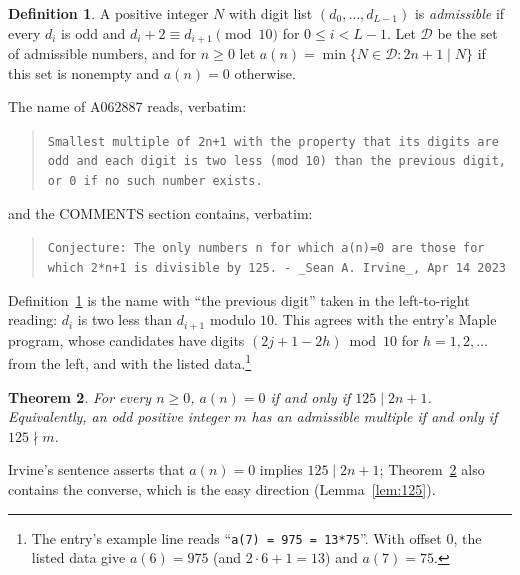 \documentclass[11pt]{amsart}
\theoremstyle{plain}
\newtheorem{theorem}{Theorem}
\theoremstyle{definition}
\newtheorem{definition}[theorem]{Definition}
\newcommand{\cD}{\mathcal{D}}
\begin{document}
\begin{definition}\label{def:adm}
A positive integer $N$ with digit list $(d_0,\dots,d_{L-1})$ is \emph{admissible} if every $d_i$ is odd and $d_i+2\equiv d_{i+1}\pmod{10}$ for $0\le i<L-1$. Let $\cD$ be the set of admissible numbers, and for $n\ge0$ let $a(n)=\min\{N\in\cD: 2n+1\mid N\}$ if this set is nonempty and $a(n)=0$ otherwise.
\end{definition}

The name of A062887 \cite{A062887} reads, verbatim:
\begin{quote}
{\small\texttt{Smallest multiple of 2n+1 with the property that its digits are odd and each digit is two less (mod 10) than the previous digit, or 0 if no such number exists.}}
\end{quote}
and the COMMENTS section contains, verbatim:
\begin{quote}
{\small\texttt{Conjecture: The only numbers n for which a(n)=0 are those for which 2*n+1 is divisible by 125. - \_Sean A. Irvine\_, Apr 14 2023}}
\end{quote}
Definition~\ref{def:adm} is the name with ``the previous digit'' taken in the left-to-right reading: $d_i$ is two less than $d_{i+1}$ modulo $10$. This agrees with the entry's Maple program, whose candidates have digits $(2j+1-2h)\bmod 10$ for $h=1,2,\dots$ from the left, and with the listed data.\footnote{The entry's example line reads ``\texttt{a(7) = 975 = 13*75}''. With offset $0$, the listed data give $a(6)=975$ (and $2\cdot6+1=13$) and $a(7)=75$.}

\begin{theorem}\label{thm:main}
For every $n\ge0$, $a(n)=0$ if and only if $125\mid 2n+1$. Equivalently, an odd positive integer $m$ has an admissible multiple if and only if $125\nmid m$.
\end{theorem}

Irvine's sentence asserts that $a(n)=0$ implies $125\mid 2n+1$; Theorem~\ref{thm:main} also contains the converse, which is the easy direction (Lemma~\ref{lem:125}).
\end{document}
